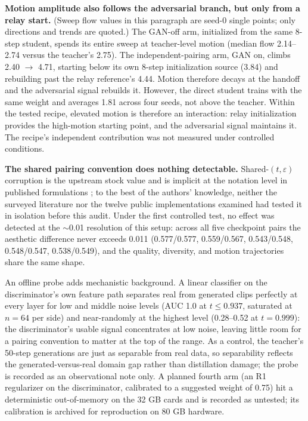 \documentclass[11pt,a4paper]{article}
\begin{document}
\textbf{Motion amplitude also follows the adversarial branch, but only from a relay start.} (Sweep flow values in this paragraph are seed-0 single points; only directions and trends are quoted.) The GAN-off arm, initialized from the same 8-step student, spends its entire sweep at teacher-level motion (median flow 2.14–2.74 versus the teacher's 2.75). The independent-pairing arm, GAN on, climbs 2.40 $\to$ 4.71, starting below its own 8-step initialization source (3.84) and rebuilding past the relay reference's 4.44. Motion therefore decays at the handoff and the adversarial signal rebuilds it. However, the direct student trains with the same weight and averages 1.81 across four seeds, not above the teacher. Within the tested recipe, elevated motion is therefore an interaction: relay initialization provides the high-motion starting point, and the adversarial signal maintains it. The recipe's independent contribution was not measured under controlled conditions.

\textbf{The shared pairing convention does nothing detectable.} Shared-$(t, \varepsilon)$ corruption is the upstream stock value and is implicit at the notation level in published formulations \cite{aad1}; to the best of the authors' knowledge, neither the surveyed literature nor the twelve public implementations examined had tested it in isolation before this audit. Under the first controlled test, no effect was detected at the $\sim$0.01 resolution of this setup: across all five checkpoint pairs the aesthetic difference never exceeds 0.011 (0.577/0.577, 0.559/0.567, 0.543/0.548, 0.548/0.547, 0.538/0.549), and the quality, diversity, and motion trajectories share the same shape.

An offline probe adds mechanistic background. A linear classifier on the discriminator's own feature path separates real from generated clips perfectly at every layer for low and middle noise levels (AUC 1.0 at $t \le 0.937$, saturated at $n = 64$ per side) and near-randomly at the highest level (0.28–0.52 at $t = 0.999$): the discriminator's usable signal concentrates at low noise, leaving little room for a pairing convention to matter at the top of the range. As a control, the teacher's 50-step generations are just as separable from real data, so separability reflects the generated-versus-real domain gap rather than distillation damage; the probe is recorded as an observational note only. A planned fourth arm (an R1 regularizer on the discriminator, calibrated to a suggested weight of 0.75) hit a deterministic out-of-memory on the 32 GB cards and is recorded as untested; its calibration is archived for reproduction on 80 GB hardware.
\end{document}

